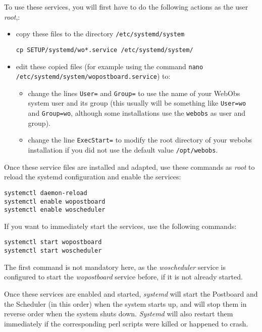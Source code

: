 To use these services, you will first have to do the following actions as the
user \textit{root},:
\begin{itemize}
	\item copy these files to the directory \texttt{/etc/systemd/system}
	\begin{lstlisting}[style=console]
cp SETUP/systemd/wo*.service /etc/systemd/system/
	\end{lstlisting}
	\item edit these copied files (for example using the command \texttt{nano
		/etc/systemd/system/wopostboard.service}) to:
		\begin{itemize}
			\item change the lines \texttt{User=} and \texttt{Group=} to use
				the name of your WebObs system user and its group (this usually
				will be something like \texttt{User=wo} and \texttt{Group=wo},
				although some installations use the \texttt{webobs} as user and
				group).
			\item change the line \texttt{ExecStart=} to modify the root
				directory of your webobs installation if you did not use the
				default value \texttt{/opt/webobs}.
		\end{itemize}
\end{itemize}

Once these service files are installed and adapted, use these commands as
\textit{root} to reload the systemd configuration and enable the services:
\begin{lstlisting}[style=console]
systemctl daemon-reload
systemctl enable wopostboard
systemctl enable woscheduler
\end{lstlisting}

If you want to immediately start the services, use the following commands:
\begin{lstlisting}[style=console]
systemctl start wopostboard
systemctl start woscheduler
\end{lstlisting}
The first command is not mandatory here, as the \textit{woscheduler} service is
configured to start the \textit{wopostboard} service before, if it is not
already started.

Once these services are enabled and started, \textit{systemd} will start the
Postboard and the Scheduler (in this order) when the system starts up, and will
stop them in reverse order when the system shuts down. \textit{Systemd} will
also restart them immediately if the corresponding perl scripts were killed or
happened to crash.

